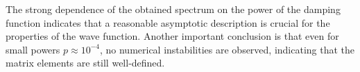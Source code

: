 The strong dependence of the obtained spectrum on the power of the damping function indicates that a reasonable asymptotic description is crucial for the properties of the wave function.
Another important conclusion is that even for small powers $p\approx 10^{-4}$, no numerical instabilities are observed, indicating that the matrix elements are still well-defined.
%

